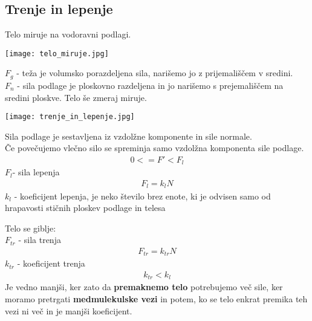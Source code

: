 {\color{indiagreen}\subsection{Trenje in lepenje}}
Telo miruje na vodoravni podlagi.\\
\begin{center}
	\texttt{[image: telo\_miruje.jpg]}
\end{center}
\textbf{$F_g$} - teža je volumsko porazdeljena sila, narišemo jo z prijemališčem v sredini.\\
\textbf{$F_n$} - sila podlage je ploskovno razdeljena in jo narišemo s prejemališčem na sredini ploskve.
Telo še zmeraj miruje.
\begin{center}
	\texttt{[image: trenje\_in\_lepenje.jpg]}
\end{center}
Sila podlage je sestavljena iz vzdolžne komponente in sile normale. \\
Če povečujemo vlečno silo se spreminja samo vzdolžna komponenta sile podlage.
\begin{align*}
	0 <= F' < F_l
\end{align*}
\textbf{$F_l$}- sila lepenja
\begin{align*}
	F_l = k_lN
\end{align*}
\textbf{$k_l$} - koeficijent lepenja, je neko število brez enote, ki je odvisen samo od hrapavosti stičnih ploskev podlage in telesa\\

Telo se giblje:\\
\textbf{$F_{tr}$} - sila trenja
\begin{align*}
	F_{tr} = k_{tr}N
\end{align*}
\textbf{$k_{tr}$} - koeficijent trenja
\begin{align*}
	k_{tr} < k_l
\end{align*}
Je vedno manjši, ker zato da \textbf{premaknemo telo} potrebujemo več sile, ker moramo pretrgati \textbf{medmulekulske vezi} in potem, ko se telo enkrat premika teh vezi ni več in je manjši koeficijent.\\